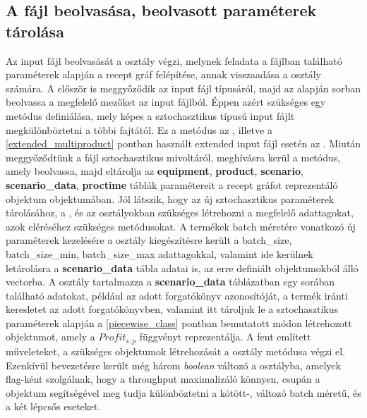\subsection{A fájl beolvasása, beolvasott paraméterek tárolása}
Az input fájl beolvasását a  osztály végzi, melynek feladata a fájlban található paraméterek alapján a recept gráf felépítése, annak visszaadása a osztály számára.
A  először is meggyőződik az input fájl típusáról, majd az alapján sorban beolvassa a megfelelő mezőket az input fájlból.
Éppen azért szükséges egy metódus definiálása, mely képes a sztochasztikus típusú input fájlt megkülönböztetni a többi fajtától.
Ez a metódus az , illetve a \ref{extended_multiproduct} pontban használt extended input fájl esetén az .
Miután meggyőződtünk a fájl sztochasztikus mivoltáról, meghívásra kerül a  metódus, amely beolvassa, majd eltárolja az \textbf{equipment}, \textbf{product}, \textbf{scenario}, \textbf{scenario\_data}, \textbf{proctime} táblák paramétereit a recept gráfot reprezentáló  objektum  objektumában.
Jól látszik, hogy az új sztochasztikus paraméterek tárolásához, a , és az  osztályokban szükséges létrehozni a megfelelő adattagokat, azok eléréséhez szükséges metódusokat.
A termékek batch méretére vonatkozó új paraméterek kezelésére a  osztály kiegészítésre került a batch\_size, batch\_size\_min, batch\_size\_max adattagokkal, valamint ide kerülnek letárolásra a \textbf{scenario\_data} tábla adatai is, az erre definiált  objektumokból álló vectorba.
A  osztály tartalmazza a \textbf{scenario\_data} táblázatban egy sorában található adatokat, például az adott forgatókönyv azonosítóját, a termék iránti keresletet az adott forgatókönyvben, valamint itt tároljuk le a sztochasztikus paraméterek alapján a \ref{piecewise_class} pontban bemutatott módon létrehozott  objektumot, amely a $Profit_{s,p}$ függvényt reprezentálja.
A fent említett műveleteket, a szükséges objektumok létrehozását a  osztály  metódusa végzi el.
Ezenkívül bevezetésre került még három \textit{boolean} változó a  osztályba,  amelyek flag-ként szolgálnak, hogy a throughput maximalizáló könnyen, csupán a  objektum segítségével meg tudja különböztetni a kötött-, változó batch méretű, és a két lépcsős eseteket.

